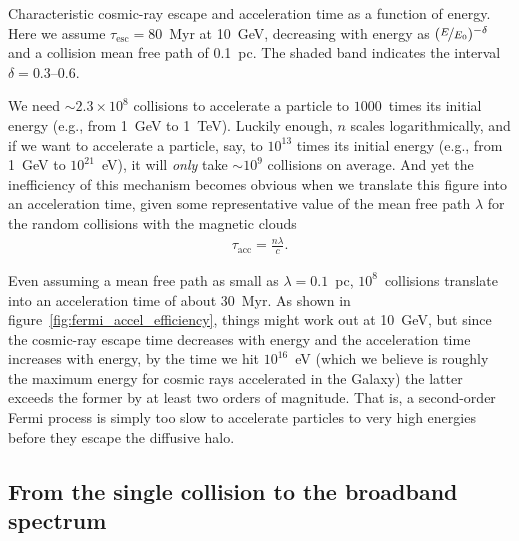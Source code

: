 \begin{marginfigure}
  
  \caption{Characteristic cosmic-ray escape and acceleration time as a function
  of energy. Here we assume $\tau_\text{esc} = 80$~Myr at 10~GeV, decreasing
  with energy as $(\nicefrac{E}{E_0})^{-\delta}$ and a collision mean free path
  of 0.1~pc. The shaded band indicates the interval $\delta = 0.3$--$0.6$.}
  \label{fig:fermi_accel_efficiency}
\end{marginfigure}

We need $\sim 2.3 \times 10^8$ collisions to accelerate a particle to $1000$~times
its initial energy (e.g., from 1~GeV to 1~TeV). Luckily enough, $n$ scales logarithmically,
and if we want to accelerate a particle, say, to $10^{13}$ times its initial energy
(e.g., from 1~GeV to $10^{21}$~eV), it will \emph{only} take $\sim 10^9$ collisions
on average. And yet the inefficiency of this mechanism becomes obvious when we translate
this figure into an acceleration time, given some representative value of the mean
free path $\lambda$ for the random collisions with the magnetic clouds
\begin{align*}
  \tau_\text{acc} = \frac{n \lambda}{c}.
\end{align*}

Even assuming a mean free path as small as $\lambda = 0.1$~pc, $10^8$~collisions
translate into an acceleration time of about 30~Myr. As shown in
figure~\ref{fig:fermi_accel_efficiency}, things might work out at 10~GeV, but
since the cosmic-ray escape time decreases with energy and the acceleration time
increases with energy, by the time we hit $10^{16}$~eV (which we believe is roughly
the maximum energy for cosmic rays accelerated in the Galaxy) the latter exceeds
the former by at least two orders of magnitude. That is, a second-order Fermi process
is simply too slow to accelerate particles to very high energies before they escape
the diffusive halo.


\subsection{From the single collision to the broadband spectrum}

